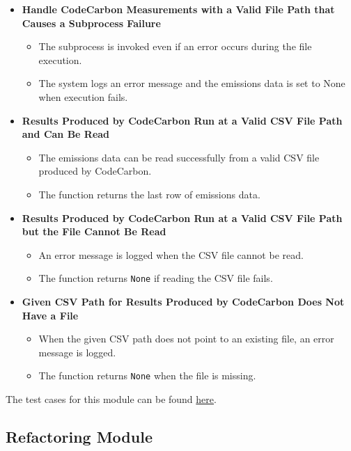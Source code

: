 \documentclass[12pt, titlepage]{article}
\begin{document}
\begin{enumerate}[label={\bf \textcolor{Maroon}{test-SRT-\arabic*}}, wide=0pt, font=\itshape]
\begin{itemize}
    \item \textbf{Handle CodeCarbon Measurements with a Valid File Path that Causes a Subprocess Failure}
    \begin{itemize}
        \item The subprocess is invoked even if an error occurs during the file execution.
        \item The system logs an error message and the emissions data is set to None when execution fails.
    \end{itemize}

    \item \textbf{Results Produced by CodeCarbon Run at a Valid CSV File Path and Can Be Read}
    \begin{itemize}
        \item The emissions data can be read successfully from a valid CSV file produced by CodeCarbon.
        \item The function returns the last row of emissions data.
    \end{itemize}

    \item \textbf{Results Produced by CodeCarbon Run at a Valid CSV File Path but the File Cannot Be Read}
    \begin{itemize}
        \item An error message is logged when the CSV file cannot be read.
        \item The function returns \texttt{None} if reading the CSV file fails.
    \end{itemize}

    \item \textbf{Given CSV Path for Results Produced by CodeCarbon Does Not Have a File}
    \begin{itemize}
        \item When the given CSV path does not point to an existing file, an error message is logged.
        \item The function returns \texttt{None} when the file is missing.
    \end{itemize}
\end{itemize}

\noindent The test cases for this module can be found \href{https://github.com/ssm-lab/capstone--source-code-optimizer/blob/new-poc/src/ecooptimizer/measurements/codecarbon_energy_meter.py}{here}.

\subsection{Refactoring Module}


\end{enumerate}
\end{document}
